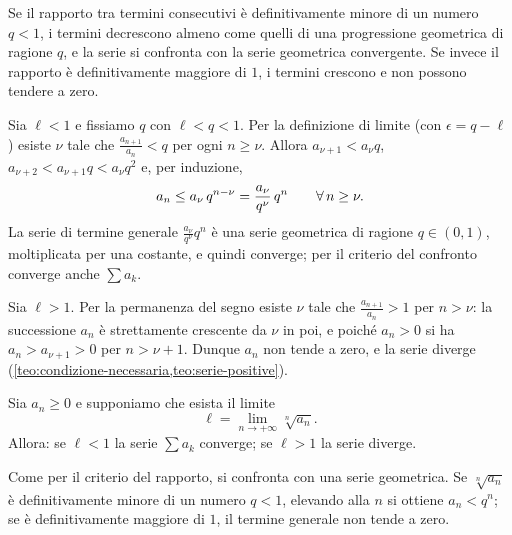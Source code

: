 \begin{strategia}
Se il rapporto tra termini consecutivi è definitivamente minore di un numero $q<1$, i
termini decrescono almeno come quelli di una progressione geometrica di ragione $q$, e la
serie si confronta con la serie geometrica convergente. Se invece il rapporto è
definitivamente maggiore di $1$, i termini crescono e non possono tendere a zero.
\end{strategia}

\begin{dimostrazione}
Sia $\ell<1$ e fissiamo $q$ con $\ell<q<1$. Per la definizione di limite (con $\epsilon=q-\ell$)
esiste $\nu$ tale che $\frac{a_{n+1}}{a_{n}}<q$ per ogni $n\ge\nu$. Allora $a_{\nu+1}<a_{\nu}q$,
$a_{\nu+2}<a_{\nu+1}q<a_{\nu}q^{2}$ e, per induzione,
\[
  a_{n}\le a_{\nu}\,q^{n-\nu}=\frac{a_{\nu}}{q^{\nu}}\,q^{n} \qquad\forall\, n\ge\nu .
\]
La serie di termine generale $\frac{a_{\nu}}{q^{\nu}}q^{n}$ è una serie geometrica di ragione
$q\in(0,1)$, moltiplicata per una costante, e quindi converge; per il criterio del confronto
converge anche $\sum a_{k}$.

Sia $\ell>1$. Per la permanenza del segno esiste $\nu$ tale che $\frac{a_{n+1}}{a_{n}}>1$ per $n>\nu$:
la successione $a_{n}$ è strettamente crescente da $\nu$ in poi, e poiché $a_{n}>0$ si ha
$a_{n}>a_{\nu+1}>0$ per $n>\nu+1$. Dunque $a_{n}$ non tende a zero, e la serie diverge
(\cref{teo:condizione-necessaria,teo:serie-positive}).
\end{dimostrazione}

\begin{teorema}\label{teo:criterio-radice}
Sia $a_{n}\ge0$ e supponiamo che esista il limite
\begin{equation}\label{eq:limite-radice}
  \ell=\lim_{n\to+\infty}\sqrt[n]{a_{n}} .
\end{equation}
Allora: se $\ell<1$ la serie $\sum a_{k}$ converge; se $\ell>1$ la serie diverge.
\end{teorema}

\begin{schema}
\end{schema}

\begin{strategia}
Come per il criterio del rapporto, si confronta con una serie geometrica. Se
$\sqrt[n]{a_{n}}$ è definitivamente minore di un numero $q<1$, elevando alla $n$ si ottiene
$a_{n}<q^{n}$; se è definitivamente maggiore di $1$, il termine generale non tende a zero.
\end{strategia}

